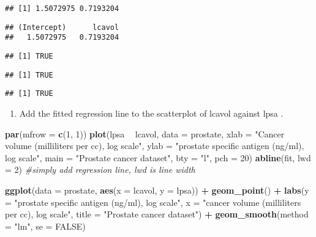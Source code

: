 \documentclass[]{book}
\newenvironment{Shaded}{\begin{snugshade}}{\end{snugshade}}
\newcommand{\CommentTok}[1]{\textcolor[rgb]{0.56,0.35,0.01}{\textit{#1}}}
\newcommand{\DataTypeTok}[1]{\textcolor[rgb]{0.13,0.29,0.53}{#1}}
\newcommand{\DecValTok}[1]{\textcolor[rgb]{0.00,0.00,0.81}{#1}}
\newcommand{\KeywordTok}[1]{\textcolor[rgb]{0.13,0.29,0.53}{\textbf{#1}}}
\newcommand{\NormalTok}[1]{#1}
\newcommand{\OperatorTok}[1]{\textcolor[rgb]{0.81,0.36,0.00}{\textbf{#1}}}
\newcommand{\OtherTok}[1]{\textcolor[rgb]{0.56,0.35,0.01}{#1}}
\newcommand{\StringTok}[1]{\textcolor[rgb]{0.31,0.60,0.02}{#1}}
\providecommand{\tightlist}{%
  \setlength{\itemsep}{0pt}\setlength{\parskip}{0pt}}
\theoremstyle{definition}
\theoremstyle{definition}
\theoremstyle{definition}
\theoremstyle{remark}
\begin{document}
\begin{verbatim}
## [1] 1.5072975 0.7193204
\end{verbatim}

\begin{verbatim}
## (Intercept)      lcavol 
##   1.5072975   0.7193204
\end{verbatim}

\begin{verbatim}
## [1] TRUE
\end{verbatim}

\begin{verbatim}
## [1] TRUE
\end{verbatim}

\begin{verbatim}
## [1] TRUE
\end{verbatim}

\begin{enumerate}
\def\labelenumi{\alph{enumi}.}
\setcounter{enumi}{5}
\tightlist
\item
  Add the fitted regression line to the scatterplot of lcavol against lpsa .
\end{enumerate}

\begin{Shaded}
\begin{Highlighting}[]
\KeywordTok{par}\NormalTok{(}\DataTypeTok{mfrow =} \KeywordTok{c}\NormalTok{(}\DecValTok{1}\NormalTok{, }\DecValTok{1}\NormalTok{))}
\KeywordTok{plot}\NormalTok{(lpsa }\OperatorTok{~}\StringTok{ }\NormalTok{lcavol, }\DataTypeTok{data =}\NormalTok{ prostate,}
  \DataTypeTok{xlab =} \StringTok{"Cancer volume (milliliters per cc), log scale"}\NormalTok{,}
  \DataTypeTok{ylab =} \StringTok{"prostate specific antigen (ng/ml), log scale"}\NormalTok{, }
  \DataTypeTok{main =} \StringTok{"Prostate cancer dataset"}\NormalTok{,}
  \DataTypeTok{bty =} \StringTok{"l"}\NormalTok{, }\DataTypeTok{pch =} \DecValTok{20}\NormalTok{)}
\KeywordTok{abline}\NormalTok{(fit, }\DataTypeTok{lwd =} \DecValTok{2}\NormalTok{) }\CommentTok{#simply add regression line, lwd is line width}
\end{Highlighting}
\end{Shaded}

\begin{Shaded}
\begin{Highlighting}[]
\KeywordTok{ggplot}\NormalTok{(}\DataTypeTok{data =}\NormalTok{ prostate, }\KeywordTok{aes}\NormalTok{(}\DataTypeTok{x =}\NormalTok{ lcavol, }\DataTypeTok{y =}\NormalTok{ lpsa)) }\OperatorTok{+}\StringTok{ }
\StringTok{  }\KeywordTok{geom_point}\NormalTok{() }\OperatorTok{+}
\StringTok{  }\KeywordTok{labs}\NormalTok{(}\DataTypeTok{y =} \StringTok{"prostate specific antigen (ng/ml), log scale"}\NormalTok{,}
       \DataTypeTok{x =} \StringTok{"cancer volume (milliliters per cc), log scale"}\NormalTok{,}
       \DataTypeTok{title =} \StringTok{"Prostate cancer dataset"}\NormalTok{) }\OperatorTok{+}\StringTok{ }
\StringTok{  }\KeywordTok{geom_smooth}\NormalTok{(}\DataTypeTok{method =} \StringTok{"lm"}\NormalTok{, }\DataTypeTok{se =} \OtherTok{FALSE}\NormalTok{)}
\end{Highlighting}
\end{Shaded}
\end{document}
